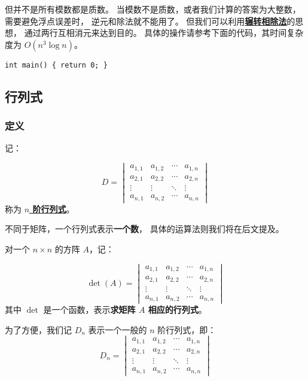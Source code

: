 \documentclass[UTF8]{article}
\begin{document}
	但并不是所有模数都是质数。
	当模数不是质数，或者我们计算的答案为大整数，需要避免浮点误差时，
	逆元和除法就不能用了。
	但我们可以利用\textbf{\uline{辗转相除法}}的思想，
	通过两行互相消元来达到目的。
	具体的操作请参考下面的代码，其时间复杂度为 $O(n^3 \log n)$。

	\lstset{language=C++}
	\begin{lstlisting}
int main() { return 0; }
	\end{lstlisting}

	\subsection{行列式}

	\subsubsection{定义}

	记：

	\begin{equation*}
		D =
		\begin{vmatrix}
			a_{1, 1} & a_{1, 2} & \cdots & a_{1, n}
			\\
			a_{2, 1} & a_{2, 2} & \cdots & a_{2, n}
			\\
			\vdots & \vdots & \ddots & \vdots
			\\
			a_{n, 1} & a_{n, 2} & \cdots & a_{n, n}
		\end{vmatrix}
	\end{equation*}
	称为 \textbf{\uline{$n$ 阶行列式}}。

	不同于矩阵，一个行列式表示\textbf{一个数}，
	具体的运算法则我们将在后文提及。

	\bigskip

	对一个 $n \times n$ 的方阵 $A$，记：

	\begin{equation*}
		\det(A) =
		\begin{vmatrix}
			a_{1, 1} & a_{1, 2} & \cdots & a_{1, n}
			\\
			a_{2, 1} & a_{2, 2} & \cdots & a_{2, n}
			\\
			\vdots & \vdots & \ddots & \vdots
			\\
			a_{n, 1} & a_{n, 2} & \cdots & a_{n, n}
		\end{vmatrix}
	\end{equation*}
	其中 $\det$ 是一个函数，表示\textbf{求矩阵 $A$ 相应的行列式}。

	\bigskip

	为了方便，我们记 $D_n$ 表示一个一般的 $n$ 阶行列式，即：
	\begin{equation*}
		D_n =
		\begin{vmatrix}
			a_{1, 1} & a_{1, 2} & \cdots & a_{1, n}
			\\
			a_{2, 1} & a_{2, 2} & \cdots & a_{2, n}
			\\
			\vdots & \vdots & \ddots & \vdots
			\\
			a_{n, 1} & a_{n, 2} & \cdots & a_{n, n}
		\end{vmatrix}
	\end{equation*}
\end{document}
